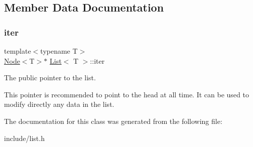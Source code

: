\subsection{Member Data Documentation}
\mbox{\label{classList_a36398f758397060735c8df9f7d11235d}} 
\subsubsection{\texorpdfstring{iter}{iter}}
{\footnotesize\ttfamily template$<$typename T$>$ \\
\hyperlink{structNode}{Node}$<$T$>$$\ast$ \hyperlink{classList}{List}$<$ T $>$\+::iter}



The public pointer to the list. 

This pointer is recommended to point to the head at all time. It can be used to modify directly any data in the list. 

The documentation for this class was generated from the following file\+:\begin{DoxyCompactItemize}
\item 
include/list.\+h\end{DoxyCompactItemize}
